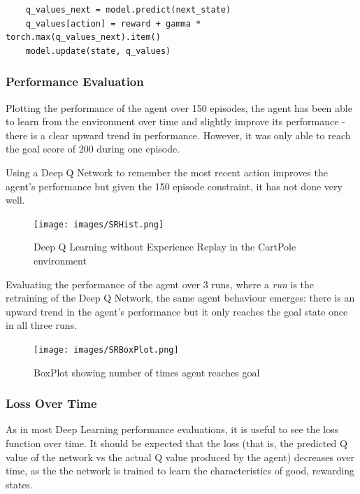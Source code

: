 \documentclass{article}
\begin{document}
\begin{verbatim}
    q_values_next = model.predict(next_state)
    q_values[action] = reward + gamma * torch.max(q_values_next).item()
    model.update(state, q_values)
\end{verbatim}

\subsubsection{Performance Evaluation}

Plotting the performance of the agent over 150 episodes, the agent has been able to learn from the environment over time and slightly improve its performance - there is a clear upward trend in performance. However, it was only able to reach the goal score of 200 during one episode. 

Using a Deep Q Network to remember the most recent action improves the agent's performance but given the 150 episode constraint, it has not done very well.

\begin{figure}[H]
    \centering
    \texttt{[image: images/SRHist.png]}
    \caption{Deep Q Learning without Experience Replay in the CartPole environment}
    \label{fig:cartpole_memless}
\end{figure}


Evaluating the performance of the agent over 3 runs, where a \textit{run} is the retraining of the Deep Q Network, the same agent behaviour emerges: there is an upward trend in the agent's performance but it only reaches the goal state once in all three runs. 

\begin{figure}[H]
    \centering
    \texttt{[image: images/SRBoxPlot.png]}
    \caption{BoxPlot showing number of times agent reaches goal}
    \label{fig:SR_BoxPlot}
\end{figure}

\subsubsection{Loss Over Time}

As in most Deep Learning performance evaluations, it is useful to see the loss function over time. It should be expected that the loss (that is, the predicted Q value of the network vs the actual Q value produced by the agent) decreases over time, as the the network is trained to learn the characteristics of good, rewarding states. 
\end{document}
